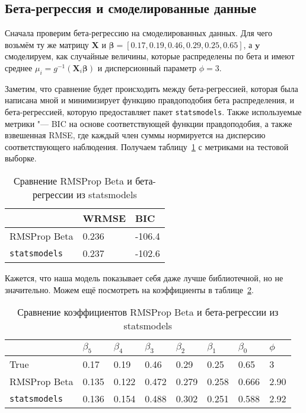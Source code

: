 \documentclass[12pt]{article}
\begin{document}
 	\subsection{Бета-регрессия и смоделированные данные}
 	
 	Сначала проверим бета-регрессию на смоделированных данных. Для чего возьмём ту же матрицу $\mathbf{X}$ и $\boldsymbol{\beta} = [0.17, 0.19, 0.46, 0.29, 0.25, 0.65]$, а $\mathbf{y}$ смоделируем, как случайные величины, которые распределены по бета и имеют среднее $\mu _i = g ^{-1} (\mathbf{X}_ i \boldsymbol{\beta})$ и дисперсионный параметр $\phi = 3$.
 	
 	Заметим, что сравнение будет происходить между бета-регрессией, которая была написана мной и минимизирует функцию правдоподобия бета распределения, и бета-регрессией, которую предоставляет пакет \verb|statsmodels|. Также используемые метрики "--- BIC на основе соответствующей функции правдоподобия, а также взвешенная RMSE, где каждый член суммы нормируется на дисперсию соответствующего наблюдения. Получаем таблицу~\ref{table2} с метриками на тестовой выборке.
 	
 	\begin{table}[h]
 		\centering
 		\caption{Сравнение RMSProp Beta и бета-регрессии из statsmodels}
 		\begin{tabular}{|l|l|l|}
 			\hline
 			& WRMSE & BIC \\ \hline
 			RMSProp Beta & 0.236 & -106.4 \\ \hline
 			\verb|statsmodels| & 0.237 & -102.6 \\ \hline
 		\end{tabular}
 		\label{table2}
 	\end{table}
	
	Кажется, что наша модель показывает себя даже лучше библиотечной, но не значительно. Можем ещё посмотреть на коэффициенты в таблице~\ref{table3}.
	
	\begin{table}[h]
		\centering
		\caption{Сравнение коэффициентов RMSProp Beta и бета-регрессии из statsmodels}
		\begin{tabular}{|l|l|l|l|l|l|l|l|}
			\hline
			& $\beta _5$ & $\beta _4$ & $\beta _3$ & $\beta _2$ &$\beta _1$ &$\beta _0$ & $\phi$ \\ \hline
			True & 0.17 & 0.19 & 0.46 & 0.29 & 0.25 & 0.65 & 3 \\ \hline
			RMSProp Beta & 0.135 & 0.122 & 0.472 & 0.279 & 0.258 & 0.666 & 2.90 \\ \hline
			\verb|statsmodels| & 0.136 & 0.154 & 0.488 & 0.302 & 0.251 & 0.588 & 2.92 \\ \hline
		\end{tabular}
		\label{table3}
	\end{table}
	
\end{document}
